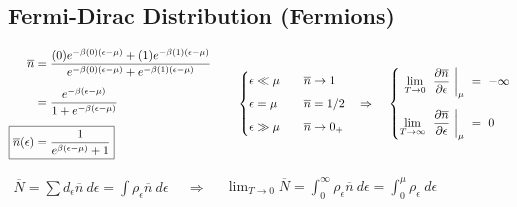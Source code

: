 \documentclass[12pt]{article}
\begin{document}
\newpage

\subsection{Fermi-Dirac Distribution (Fermions)}
\(\begin{aligned}
    \overline{n} &= \frac{ (0) e^{-\beta(0)(\epsilon-\mu)}
        + (1) e^{-\beta (1)(\epsilon-\mu)} }{ e^{-\beta(0)(\epsilon-\mu)} 
        + e^{-\beta (1)(\epsilon-\mu)} }\\[5pt]
    &= \frac{e^{-\beta (\epsilon-\mu)}}{ 1 + e^{-\beta (\epsilon-\mu)} }\\[5pt]
    \Aboxed{ \overline{n}(\epsilon) &= \frac{1}{ e^{\beta (\epsilon-\mu)} + 1 } }
\end{aligned}
\hspace{.75cm}
\begin{cases}
    \epsilon \ll \mu  & \hspace{10pt} \overline{n} \rightarrow 1\\[5pt]
    \epsilon = \mu  & \hspace{10pt} \overline{n} = 1/2 \ \ \ \Rightarrow\\[5pt]
    \epsilon \gg \mu  & \hspace{10pt} \overline{n} \rightarrow 0_+
\end{cases}
\hspace{.4cm}
\left\{\begin{aligned}
    \lim_{T \rightarrow 0} \
        &\left.\frac{\partial \overline{n}}{\partial \epsilon}\ \right|_\mu \ =\ -\infty\\[5pt]
    \lim_{T \rightarrow \infty} \
        &\left.\frac{\partial \overline{n}}{\partial \epsilon}\ \right|_\mu \ =\ 0
\end{aligned}\right.\)

\vspace{10pt}\noindent
\(\begin{aligned}
    \boxed{ \overline{N} = \sum d_\epsilon \overline{n}\ d\epsilon 
        = \int \rho_\epsilon \overline{n}\ d\epsilon }
\end{aligned} 
\hspace{10pt}
\Rightarrow
\hspace{10pt}
\begin{aligned}
    \boxed{ \lim_{T \rightarrow0} \overline{N} = \int_0^\infty \rho_\epsilon \overline{n}\ d\epsilon 
        = \int_0^\mu \rho_\epsilon\ d\epsilon }
\end{aligned}\)
\end{document}
